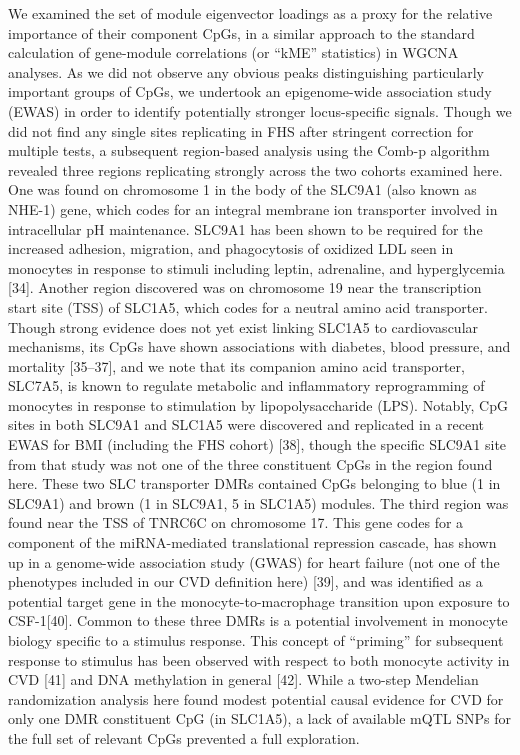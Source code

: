 \documentclass[]{bmcart}
\begin{document}
We examined the set of module eigenvector loadings as a proxy for the
relative importance of their component CpGs, in a similar approach to
the standard calculation of gene-module correlations (or ``kME''
statistics) in WGCNA analyses. As we did not observe any obvious peaks
distinguishing particularly important groups of CpGs, we undertook an
epigenome-wide association study (EWAS) in order to identify potentially
stronger locus-specific signals. Though we did not find any single sites
replicating in FHS after stringent correction for multiple tests, a
subsequent region-based analysis using the Comb-p algorithm revealed
three regions replicating strongly across the two cohorts examined here.
One was found on chromosome 1 in the body of the SLC9A1 (also known as
NHE-1) gene, which codes for an integral membrane ion transporter
involved in intracellular pH maintenance. SLC9A1 has been shown to be
required for the increased adhesion, migration, and phagocytosis of
oxidized LDL seen in monocytes in response to stimuli including leptin,
adrenaline, and hyperglycemia {[}34{]}. Another region discovered was on
chromosome 19 near the transcription start site (TSS) of SLC1A5, which
codes for a neutral amino acid transporter. Though strong evidence does
not yet exist linking SLC1A5 to cardiovascular mechanisms, its CpGs have
shown associations with diabetes, blood pressure, and mortality
{[}35--37{]}, and we note that its companion amino acid transporter,
SLC7A5, is known to regulate metabolic and inflammatory reprogramming of
monocytes in response to stimulation by lipopolysaccharide (LPS).
Notably, CpG sites in both SLC9A1 and SLC1A5 were discovered and
replicated in a recent EWAS for BMI (including the FHS cohort) {[}38{]},
though the specific SLC9A1 site from that study was not one of the three
constituent CpGs in the region found here. These two SLC transporter
DMRs contained CpGs belonging to blue (1 in SLC9A1) and brown (1 in
SLC9A1, 5 in SLC1A5) modules. The third region was found near the TSS of
TNRC6C on chromosome 17. This gene codes for a component of the
miRNA-mediated translational repression cascade, has shown up in a
genome-wide association study (GWAS) for heart failure (not one of the
phenotypes included in our CVD definition here) {[}39{]}, and was
identified as a potential target gene in the monocyte-to-macrophage
transition upon exposure to CSF-1{[}40{]}. Common to these three DMRs is
a potential involvement in monocyte biology specific to a stimulus
response. This concept of ``priming'' for subsequent response to
stimulus has been observed with respect to both monocyte activity in CVD
{[}41{]} and DNA methylation in general {[}42{]}. While a two-step
Mendelian randomization analysis here found modest potential causal
evidence for CVD for only one DMR constituent CpG (in SLC1A5), a lack of
available mQTL SNPs for the full set of relevant CpGs prevented a full
exploration.
\end{document}

